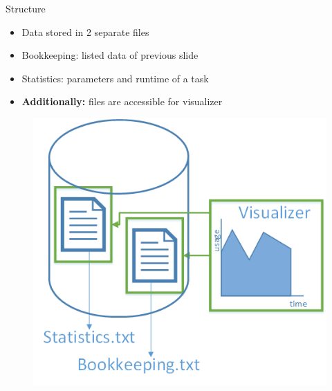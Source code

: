 	\begin{frame}{Structure}
		\begin{minipage}[]{.5\textwidth}%
		\begin{itemize}
		\item<2->{} {Data stored in 2 separate files}
		\item<3->{} {Bookkeeping: listed data of previous slide}
		\item<4->{} {Statistics: parameters and runtime of a task}
		\item<5->{} {\textbf{Additionally: }files are accessible for visualizer}
		\end{itemize}
		\end{minipage}
		\begin{minipage}[]{.45\textwidth}%
		\begin{figure}[h]
		\flushright  %
		\vspace{-\ht\strutbox}\includegraphics[width=\textwidth]{images/data.png}
		\end{figure}
		\end{minipage}
	\end{frame}

